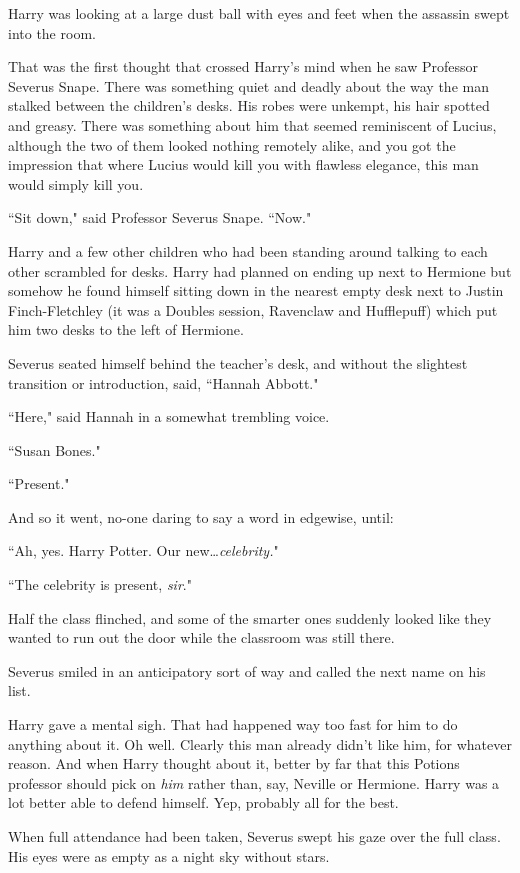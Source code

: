 Harry was looking at a large dust ball with eyes and feet when the assassin swept into the room.

That was the first thought that crossed Harry's mind when he saw Professor Severus Snape. There was something quiet and deadly about the way the man stalked between the children's desks. His robes were unkempt, his hair spotted and greasy. There was something about him that seemed reminiscent of Lucius, although the two of them looked nothing remotely alike, and you got the impression that where Lucius would kill you with flawless elegance, this man would simply kill you.

``Sit down," said Professor Severus Snape. ``Now."

Harry and a few other children who had been standing around talking to each other scrambled for desks. Harry had planned on ending up next to Hermione but somehow he found himself sitting down in the nearest empty desk next to Justin Finch-Fletchley (it was a Doubles session, Ravenclaw and Hufflepuff) which put him two desks to the left of Hermione.

Severus seated himself behind the teacher's desk, and without the slightest transition or introduction, said, ``Hannah Abbott."

``Here," said Hannah in a somewhat trembling voice.

``Susan Bones."

``Present."

And so it went, no-one daring to say a word in edgewise, until:

``Ah, yes. Harry Potter. Our new…\emph{celebrity.}"

``The celebrity is present, \emph{sir}."

Half the class flinched, and some of the smarter ones suddenly looked like they wanted to run out the door while the classroom was still there.

Severus smiled in an anticipatory sort of way and called the next name on his list.

Harry gave a mental sigh. That had happened way too fast for him to do anything about it. Oh well. Clearly this man already didn't like him, for whatever reason. And when Harry thought about it, better by far that this Potions professor should pick on \emph{him} rather than, say, Neville or Hermione. Harry was a lot better able to defend himself. Yep, probably all for the best.

When full attendance had been taken, Severus swept his gaze over the full class. His eyes were as empty as a night sky without stars.

